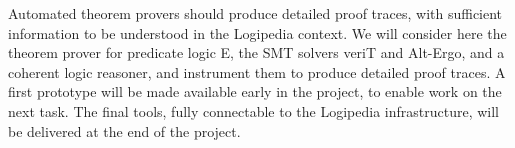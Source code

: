 \begin{workpackage}
\begin{tasklist}
\begin{task}[id=instrumenting,
      title=Instrumenting ATPs to produce traces,
      lead=Lie,
      LieRM=28,
      ImtRM=1,
      OcaRM=12,
      BelRM=6,
      wphases=1-48!1.0
    ]
    Automated theorem provers should produce detailed proof traces, with
    sufficient information to be understood in the Logipedia context.  We will
    consider here the theorem prover for predicate logic E, the SMT solvers
    veriT and Alt-Ergo, and a
    coherent logic reasoner, and instrument them to produce detailed proof
    traces.  A first prototype will be made available early in the project, to
    enable work on the next task.  The final tools, fully connectable to the
    Logipedia infrastructure, will be delivered at the end of the project.








\end{task}


  \begin{task}[id=tracetodedukti,
      title=Translate ATP traces into Dedukti,
      lead=Imt,
      LieRM=12,
      ImtRM=8,
      SacRM=2,
      wphases=7-48!.5
    ]


\end{task}
\end{tasklist}
\end{workpackage}
